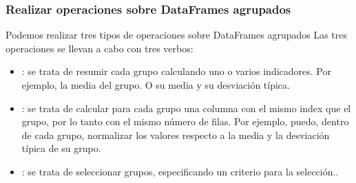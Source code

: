 \documentclass[9pt]{beamer}
\begin{document}
\begin{frame}
  \frametitle{Realizar operaciones sobre DataFrames agrupados}
  \begin{block}{Podemos realizar tres tipos de operaciones sobre DataFrames agrupados}
    Las tres operaciones se llevan a cabo con tres verbos:
    \begin{itemize}
      \item<2-> : se trata de resumir cada grupo calculando uno o varios indicadores. Por ejemplo, la media del grupo. O su media y su desviación típica.
      \item<3-> : se trata de calcular para cada grupo una columna con el mismo index que el grupo, por lo tanto con el mismo número de filas. Por ejemplo, puedo, dentro de cada grupo, normalizar los valores respecto a la media y la desviación típica de su grupo.
      \item<4-> : se trata de seleccionar grupos,
        especificando un criterio para la selección..
    \end{itemize}
  \end{block}
  \end{frame}
\end{document}
